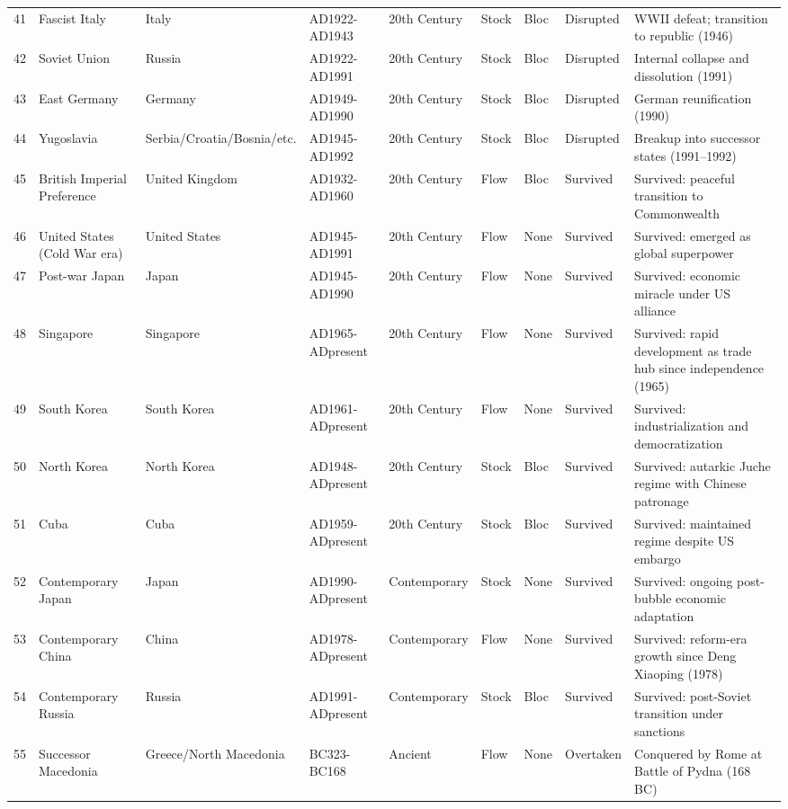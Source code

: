 \documentclass[11pt]{article}
\begin{document}
\begin{longtable}{rlllllllp{6cm}}
41 & Fascist Italy & Italy & AD1922-AD1943 & 20th Century & Stock & Bloc & Disrupted & WWII defeat; transition to republic (1946) \\
42 & Soviet Union & Russia & AD1922-AD1991 & 20th Century & Stock & Bloc & Disrupted & Internal collapse and dissolution (1991) \\
43 & East Germany & Germany & AD1949-AD1990 & 20th Century & Stock & Bloc & Disrupted & German reunification (1990) \\
44 & Yugoslavia & Serbia/Croatia/Bosnia/etc. & AD1945-AD1992 & 20th Century & Stock & Bloc & Disrupted & Breakup into successor states (1991--1992) \\
45 & British Imperial Preference & United Kingdom & AD1932-AD1960 & 20th Century & Flow & Bloc & Survived & Survived: peaceful transition to Commonwealth \\
46 & United States (Cold War era) & United States & AD1945-AD1991 & 20th Century & Flow & None & Survived & Survived: emerged as global superpower \\
47 & Post-war Japan & Japan & AD1945-AD1990 & 20th Century & Flow & None & Survived & Survived: economic miracle under US alliance \\
48 & Singapore & Singapore & AD1965-ADpresent & 20th Century & Flow & None & Survived & Survived: rapid development as trade hub since independence (1965) \\
49 & South Korea & South Korea & AD1961-ADpresent & 20th Century & Flow & None & Survived & Survived: industrialization and democratization \\
50 & North Korea & North Korea & AD1948-ADpresent & 20th Century & Stock & Bloc & Survived & Survived: autarkic Juche regime with Chinese patronage \\
51 & Cuba & Cuba & AD1959-ADpresent & 20th Century & Stock & Bloc & Survived & Survived: maintained regime despite US embargo \\
52 & Contemporary Japan & Japan & AD1990-ADpresent & Contemporary & Stock & None & Survived & Survived: ongoing post-bubble economic adaptation \\
53 & Contemporary China & China & AD1978-ADpresent & Contemporary & Flow & None & Survived & Survived: reform-era growth since Deng Xiaoping (1978) \\
54 & Contemporary Russia & Russia & AD1991-ADpresent & Contemporary & Stock & Bloc & Survived & Survived: post-Soviet transition under sanctions \\
55 & Successor Macedonia & Greece/North Macedonia & BC323-BC168 & Ancient & Flow & None & Overtaken & Conquered by Rome at Battle of Pydna (168 BC) \\

\end{longtable}
\end{document}
